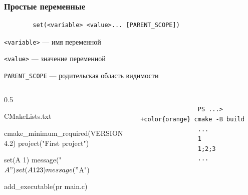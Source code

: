 \documentclass[10pt, aspectratio=1610]{beamer}
\begin{document}
\begin{frame}[fragile]\frametitle{Простые переменные}
	
	\begin{verbatim}
		set(<variable> <value>... [PARENT_SCOPE])
	\end{verbatim}
	
	\verb|<variable>| --- имя переменной
	
	\verb|<value>| --- значение переменной 
	
	\verb|PARENT_SCOPE| --- родительская область видимости
	
	\begin{columns}[]
		\edef\colA{0.5}
		\begin{column}{\colA\linewidth}
			\begin{block}{CMakeLists.txt}
				\begin{cmakecode}
					cmake_minimum_required(VERSION 4.2)
					project("First project")
					
					set(A 1)
					message("${A}")
					set(A 1 2 3)
					message("${A}")
					
					add_executable(pr main.c)
				\end{cmakecode}
			\end{block}
		\end{column}
		\begin{column}{\fpeval{1-\colA}\linewidth}
			\begin{Verbatim}[bgcolor=black,tabsize=5,formatcom=\color{white},gobble=4,fontsize=\footnotesize, xleftmargin=0em, frame=single,framerule=0pt ,rulecolor=\color{red},framesep=1em,fillcolor=\color{black}, commandchars=+\{\}]
				
				PS ...> +color{orange} cmake -B build
				...
				1
				1;2;3
				... 
				
			\end{Verbatim}
		\end{column}
	\end{columns}
	
\end{frame}
\end{document}
